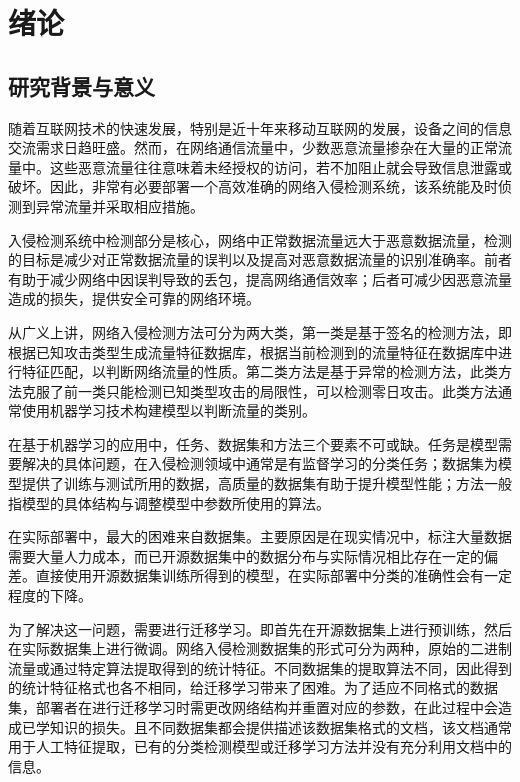 
\chapter{绪论}
\label{cha:intro}


\section{研究背景与意义}
\label{sec:Background and meaning}
随着互联网技术的快速发展，特别是近十年来移动互联网的发展，设备之间的信息交流需求日趋旺盛。然而，在网络通信流量中，少数恶意流量掺杂在大量的正常流量中。这些恶意流量往往意味着未经授权的访问，若不加阻止就会导致信息泄露或破坏。因此，非常有必要部署一个高效准确的网络入侵检测系统，该系统能及时侦测到异常流量并采取相应措施。

入侵检测系统中检测部分是核心，网络中正常数据流量远大于恶意数据流量，检测的目标是减少对正常数据流量的误判以及提高对恶意数据流量的识别准确率。前者有助于减少网络中因误判导致的丢包，提高网络通信效率；后者可减少因恶意流量造成的损失，提供安全可靠的网络环境。

从广义上讲，网络入侵检测方法可分为两大类，第一类是基于签名的检测方法，即根据已知攻击类型生成流量特征数据库，根据当前检测到的流量特征在数据库中进行特征匹配，以判断网络流量的性质。第二类方法是基于异常的检测方法，此类方法克服了前一类只能检测已知类型攻击的局限性，可以检测零日攻击\cite{XXAQ202402001}。此类方法通常使用机器学习技术构建模型以判断流量的类别。

在基于机器学习的应用中，任务、数据集和方法三个要素不可或缺。任务是模型需要解决的具体问题，在入侵检测领域中通常是有监督学习的分类任务；数据集为模型提供了训练与测试所用的数据，高质量的数据集有助于提升模型性能；方法一般指模型的具体结构与调整模型中参数所使用的算法。

在实际部署中，最大的困难来自数据集。主要原因是在现实情况中，标注大量数据需要大量人力成本，而已开源数据集中的数据分布与实际情况相比存在一定的偏差。直接使用开源数据集训练所得到的模型，在实际部署中分类的准确性会有一定程度的下降。

为了解决这一问题，需要进行迁移学习。即首先在开源数据集上进行预训练，然后在实际数据集上进行微调。网络入侵检测数据集的形式可分为两种，原始的二进制流量或通过特定算法提取得到的统计特征。不同数据集的提取算法不同，因此得到的统计特征格式也各不相同，给迁移学习带来了困难。为了适应不同格式的数据集，部署者在进行迁移学习时需更改网络结构并重置对应的参数，在此过程中会造成已学知识的损失。且不同数据集都会提供描述该数据集格式的文档，该文档通常用于人工特征提取，已有的分类检测模型或迁移学习方法并没有充分利用文档中的信息。

